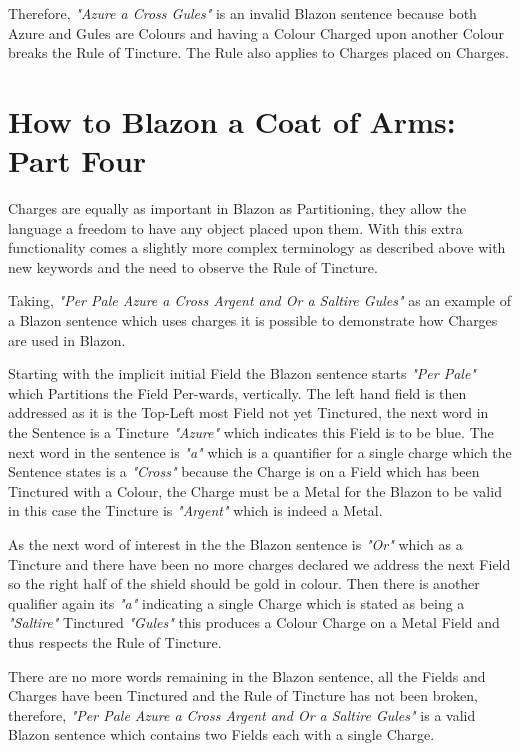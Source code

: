 Therefore, \emph{"Azure a Cross Gules"} is an invalid Blazon sentence because both Azure and Gules are Colours and having a Colour Charged upon another Colour breaks the Rule of Tincture.  The Rule also applies to Charges placed on Charges. 

\section{How to Blazon a Coat of Arms: Part Four}

Charges are equally as important in Blazon as Partitioning, they allow the language a freedom to have any object placed upon them. With this extra functionality comes a slightly more complex terminology as described above with new keywords and the need to observe the Rule of Tincture.  

Taking, \emph{"Per Pale Azure a Cross Argent and Or a Saltire Gules"} as an example of a Blazon sentence which uses charges it is possible to demonstrate how Charges are used in Blazon.  

Starting with the implicit initial Field the Blazon sentence starts \emph{"Per Pale"} which Partitions the Field Per-wards, vertically. The left hand field is then addressed as it is the Top-Left most Field not yet Tinctured, the next word in the Sentence is a Tincture \emph{"Azure"} which indicates this Field is to be blue.  The next word in the sentence is \emph{"a"} which is a quantifier for a single charge which the Sentence states is a \emph{"Cross"} because the Charge is on a Field which has been Tinctured with a Colour, the Charge must be a Metal for the Blazon to be valid in this case the Tincture is \emph{"Argent"} which is indeed a Metal.  

As the next word of interest in the the Blazon sentence is \emph{"Or"} which as a Tincture and there have been no more charges declared we address the next Field so the right half of the shield should be gold in colour. Then there is another qualifier again its \emph{"a"} indicating a single Charge which is stated as being a \emph{"Saltire"} Tinctured \emph{"Gules"} this produces a Colour Charge on a Metal Field and thus respects the Rule of Tincture.  

There are no more words remaining in the Blazon sentence, all the Fields and Charges have been Tinctured and the Rule of Tincture has not been broken, therefore, \emph{"Per Pale Azure a Cross Argent and Or a Saltire Gules"} is a valid Blazon sentence which contains two Fields each with a single Charge. 


